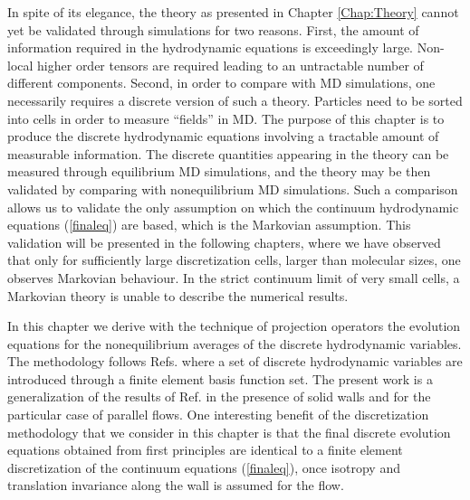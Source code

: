 \documentclass[b5paper,openright,10pt]{book}
\begin{document}
In   spite   of   its   elegance,   the   theory   as   presented   in
Chapter \ref{Chap:Theory}  cannot yet  be validated  through simulations
for two  reasons.  First,  the amount of  information required  in the
hydrodynamic equations  is exceedingly  large. Non-local  higher order
tensors are  required leading  to an  untractable number  of different
components.   Second, in  order to  compare with  MD simulations,  one
necessarily requires  a discrete version  of such a  theory. Particles
need to  be sorted into  cells in order  to measure ``fields''  in MD.
The  purpose  of  this chapter  is  to  produce  the  discrete
hydrodynamic  equations involving  a  tractable  amount of  measurable
information. The  discrete quantities appearing  in the theory  can be
measured through  equilibrium MD  simulations, and  the theory  may be
then validated by comparing with nonequilibrium MD simulations.  Such
a comparison  allows us to validate  the only assumption on  which the
continuum hydrodynamic equations (\ref{finaleq}) are
based, which  is the  Markovian assumption.   This validation  will be
presented in the following chapters, where  we have observed  that only
for  sufficiently large  discretization cells,  larger than  molecular
sizes,  one observes  Markovian  behaviour.  In  the strict  continuum
limit of  very small cells, a  Markovian theory is unable  to describe
the numerical  results.  

In  this chapter  we  derive  with  the technique  of  projection
operators the  evolution equations for the  nonequilibrium averages of
the discrete  hydrodynamic variables.   The methodology  follows Refs.
\cite{Espanol2009i,Espanol2009c,DelaTorre2015,EspanolDonev2015}  where
a  set of  discrete hydrodynamic  variables are  introduced through  a
finite  element   basis  function   set.   The   present  work   is  a
generalization of the results  of Ref.  \cite{EspanolDonev2015} in the
presence of solid walls and for the particular case of parallel flows.
One
interesting benefit of the discretization methodology that we consider
in this chapter is that  the final discrete evolution equations obtained
from first principles are identical to a finite element discretization
of the  continuum equations  (\ref{finaleq}),  once isotropy
and translation invariance along the wall is assumed for the flow.
\end{document}
